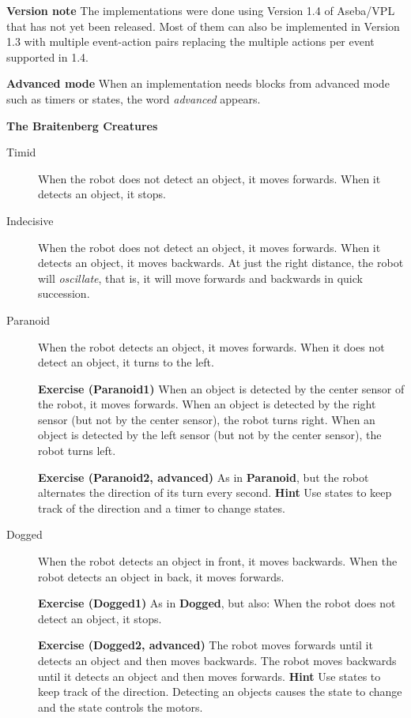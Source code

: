 \documentclass[12pt,a4paper,english]{report}
\begin{document}
\textbf{Version note} The implementations were done using Version 1.4 of
Aseba/\textsc{VPL} that has not yet been released. Most of them can also
be implemented in Version 1.3 with multiple event-action pairs replacing
the multiple actions per event supported in 1.4.

\textbf{Advanced mode} When an implementation needs blocks from advanced
mode such as timers or states, the word \emph{advanced} appears.

\newpage

\begin{center}
\Large \textbf{The Braitenberg Creatures}
\end{center}

\begin{description}

\item[Timid] When the robot does not detect an object, it moves forwards.
When it detects an object, it stops.

\item[Indecisive] When the robot does not detect an object, it moves
forwards. When it detects an object, it moves backwards. At just the
right distance, the robot will \emph{oscillate}, that is, it will move
forwards and backwards in quick succession.

\item[Paranoid] When the robot detects an object, it moves forwards. When
it does not detect an object, it turns to the left.

\textbf{Exercise (Paranoid1)} When an object is detected by the center
sensor of the robot, it moves forwards. When an object is detected by
the right sensor (but not by the center sensor), the robot turns right.
When an object is detected by the left sensor (but not by the center
sensor), the robot turns left.

\textbf{Exercise (Paranoid2, advanced)} As in \textbf{Paranoid}, but the
robot alternates the direction of its turn every second. \textbf{Hint}
Use states to keep track of the direction and a timer to change states.

\item[Dogged] When the robot detects an object in front, it moves
backwards. When the robot detects an object in back, it moves forwards.

\textbf{Exercise (Dogged1)} As in \textbf{Dogged}, but also: When the
robot does not detect an object, it stops.

\textbf{Exercise (Dogged2, advanced)} The robot moves forwards until it
detects an object and then moves backwards. The robot moves backwards
until it detects an object and then moves forwards. \textbf{Hint} Use
states to keep track of the direction. Detecting an objects causes the
state to change and the state controls the motors.


\end{description}
\end{document}
